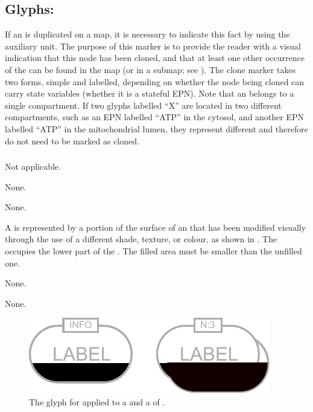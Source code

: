 \subsection{Glyphs: }
\label{sec:cloneMarker}

If an  is duplicated on a map, it is necessary to indicate this fact by using the  auxiliary unit.
The purpose of this marker is to provide the reader with a visual indication that this node has been cloned, and that at least one other occurrence of the  can be found in the map (or in a submap; see ).
The clone marker takes two forms, simple and labelled, depending on whether the node being cloned can carry state variables (\ie whether it is a stateful EPN).
Note that an  belongs to a single compartment.
If two glyphs labelled ``X'' are located in two different compartments, such as an EPN labelled ``ATP'' in the cytosol, and another EPN labelled ``ATP'' in the mitochondrial lumen, they represent different  and therefore do not need to be marked as cloned.

\subsubsection{}

\begin{glyphDescription}

\glyphSboTerm
Not applicable.


\glyphIncoming
None.



\glyphOutgoing
None.


\glyphContainer
A  is represented by a portion of the surface of an  that has been modified visually through the use of a different shade, texture, or colour, as shown in .
The  occupies the lower part of the .
The filled area must be smaller than the unfilled one.

\glyphLabel
None.

\glyphAux
None.

\end{glyphDescription}

\begin{figure}[H]
  \centering
  \includegraphics{images/simpleCloneMarker}
  \caption{The \PD glyph for  applied to a  and a  of .}
  \label{fig:simpleCloneMarker}
\end{figure}

